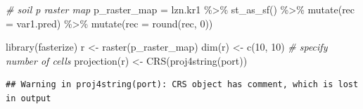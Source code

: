 \documentclass[
]{book}
\newenvironment{Shaded}{\begin{snugshade}}{\end{snugshade}}
\newcommand{\AttributeTok}[1]{\textcolor[rgb]{0.77,0.63,0.00}{#1}}
\newcommand{\CommentTok}[1]{\textcolor[rgb]{0.56,0.35,0.01}{\textit{#1}}}
\newcommand{\DecValTok}[1]{\textcolor[rgb]{0.00,0.00,0.81}{#1}}
\newcommand{\FunctionTok}[1]{\textcolor[rgb]{0.00,0.00,0.00}{#1}}
\newcommand{\NormalTok}[1]{#1}
\newcommand{\OtherTok}[1]{\textcolor[rgb]{0.56,0.35,0.01}{#1}}
\newcommand{\SpecialCharTok}[1]{\textcolor[rgb]{0.00,0.00,0.00}{#1}}
\begin{document}
\begin{Shaded}
\begin{Highlighting}[]
\CommentTok{\# soil p raster map}
\NormalTok{p\_raster\_map }\OtherTok{=}\NormalTok{ lzn.kr1 }\SpecialCharTok{\%\textgreater{}\%}
  \FunctionTok{st\_as\_sf}\NormalTok{() }\SpecialCharTok{\%\textgreater{}\%}
  \FunctionTok{mutate}\NormalTok{(}\AttributeTok{rec =}\NormalTok{ var1.pred) }\SpecialCharTok{\%\textgreater{}\%}
  \FunctionTok{mutate}\NormalTok{(}\AttributeTok{rec =} \FunctionTok{round}\NormalTok{(rec, }\DecValTok{0}\NormalTok{)) }

\FunctionTok{library}\NormalTok{(fasterize)}
\NormalTok{r }\OtherTok{\textless{}{-}} \FunctionTok{raster}\NormalTok{(p\_raster\_map)}
\FunctionTok{dim}\NormalTok{(r) }\OtherTok{\textless{}{-}} \FunctionTok{c}\NormalTok{(}\DecValTok{10}\NormalTok{, }\DecValTok{10}\NormalTok{)                      }\CommentTok{\# specify number of cells}
\FunctionTok{projection}\NormalTok{(r) }\OtherTok{\textless{}{-}} \FunctionTok{CRS}\NormalTok{(}\FunctionTok{proj4string}\NormalTok{(port))}
\end{Highlighting}
\end{Shaded}

\begin{verbatim}
## Warning in proj4string(port): CRS object has comment, which is lost in output
\end{verbatim}
\end{document}
